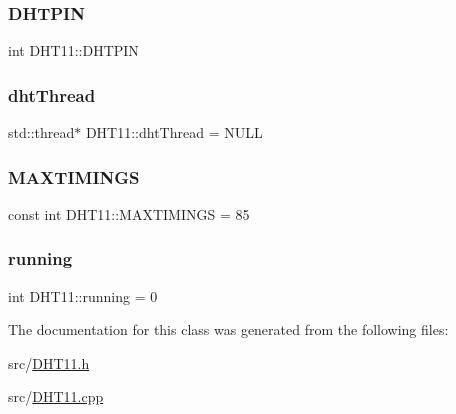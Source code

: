 \subsubsection{\texorpdfstring{D\+H\+T\+P\+IN}{DHTPIN}}
{\footnotesize\ttfamily int D\+H\+T11\+::\+D\+H\+T\+P\+IN\hspace{0.3cm}{\ttfamily [private]}}

\mbox{\label{classDHT11_a5e25d02345012c339d450951df5cebf7}} 
\subsubsection{\texorpdfstring{dht\+Thread}{dhtThread}}
{\footnotesize\ttfamily std\+::thread$\ast$ D\+H\+T11\+::dht\+Thread = N\+U\+LL\hspace{0.3cm}{\ttfamily [private]}}

\mbox{\label{classDHT11_aba8c5976478e858ec94a70d29deac72d}} 
\subsubsection{\texorpdfstring{M\+A\+X\+T\+I\+M\+I\+N\+GS}{MAXTIMINGS}}
{\footnotesize\ttfamily const int D\+H\+T11\+::\+M\+A\+X\+T\+I\+M\+I\+N\+GS = 85\hspace{0.3cm}{\ttfamily [private]}}

\mbox{\label{classDHT11_a5e1eeeaac76105d3c7db78b63cab007d}} 
\subsubsection{\texorpdfstring{running}{running}}
{\footnotesize\ttfamily int D\+H\+T11\+::running = 0\hspace{0.3cm}{\ttfamily [private]}}



The documentation for this class was generated from the following files\+:\begin{DoxyCompactItemize}
\item 
src/\hyperlink{DHT11_8h}{D\+H\+T11.\+h}\item 
src/\hyperlink{DHT11_8cpp}{D\+H\+T11.\+cpp}\end{DoxyCompactItemize}
